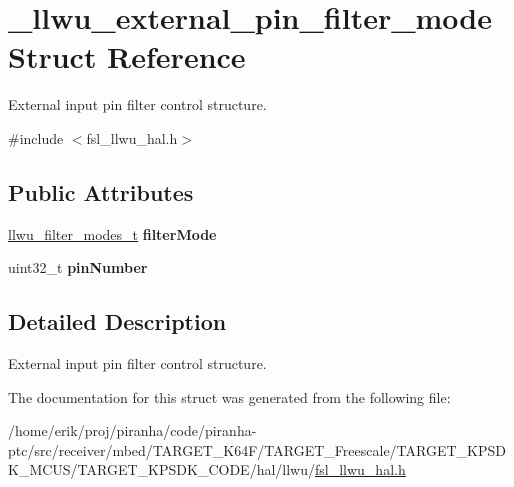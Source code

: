 \hypertarget{struct__llwu__external__pin__filter__mode}{}\section{\+\_\+llwu\+\_\+external\+\_\+pin\+\_\+filter\+\_\+mode Struct Reference}
\label{struct__llwu__external__pin__filter__mode}


External input pin filter control structure.  




{\ttfamily \#include $<$fsl\+\_\+llwu\+\_\+hal.\+h$>$}

\subsection*{Public Attributes}
\begin{DoxyCompactItemize}
\item 
\hyperlink{group__llwu__hal_ga38fe75a772f102c3273d23bdefb37c1b}{llwu\+\_\+filter\+\_\+modes\+\_\+t} {\bfseries filter\+Mode}\hypertarget{struct__llwu__external__pin__filter__mode_acc2d6f3baac1129d2583f8518e8e9aa9}{}\label{struct__llwu__external__pin__filter__mode_acc2d6f3baac1129d2583f8518e8e9aa9}

\item 
uint32\+\_\+t {\bfseries pin\+Number}\hypertarget{struct__llwu__external__pin__filter__mode_a966a283210635be30808f0d718985223}{}\label{struct__llwu__external__pin__filter__mode_a966a283210635be30808f0d718985223}

\end{DoxyCompactItemize}


\subsection{Detailed Description}
External input pin filter control structure. 

The documentation for this struct was generated from the following file\+:\begin{DoxyCompactItemize}
\item 
/home/erik/proj/piranha/code/piranha-\/ptc/src/receiver/mbed/\+T\+A\+R\+G\+E\+T\+\_\+\+K64\+F/\+T\+A\+R\+G\+E\+T\+\_\+\+Freescale/\+T\+A\+R\+G\+E\+T\+\_\+\+K\+P\+S\+D\+K\+\_\+\+M\+C\+U\+S/\+T\+A\+R\+G\+E\+T\+\_\+\+K\+P\+S\+D\+K\+\_\+\+C\+O\+D\+E/hal/llwu/\hyperlink{fsl__llwu__hal_8h}{fsl\+\_\+llwu\+\_\+hal.\+h}\end{DoxyCompactItemize}

